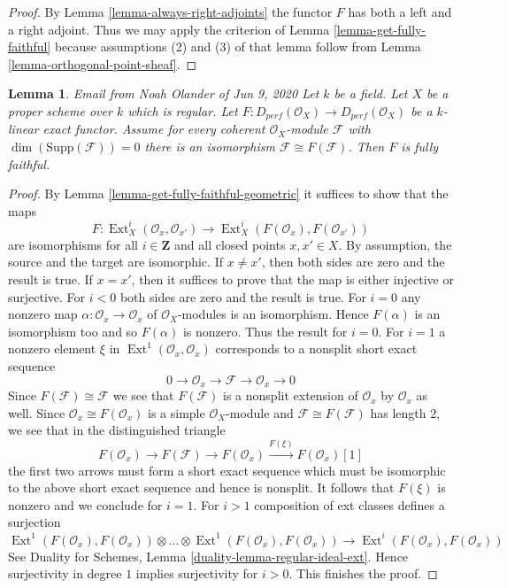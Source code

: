 \documentclass{stacks-project}
\newenvironment{reference}{\comment}{\endcomment}
\theoremstyle{plain}
\newtheorem{lemma}[subsection]{Lemma}
\theoremstyle{definition}
\theoremstyle{remark}
\numberwithin{equation}{subsection}
\def\Ext{\mathop{\mathrm{Ext}}\nolimits}
\begin{document}
\begin{proof}
By Lemma \ref{lemma-always-right-adjoints} the functor $F$
has both a left and a right adjoint. Thus we may apply the criterion
of Lemma \ref{lemma-get-fully-faithful}
because assumptions (2) and (3) of that lemma
follow from Lemma \ref{lemma-orthogonal-point-sheaf}.
\end{proof}

\begin{lemma}
\label{lemma-noah-pre}
\begin{reference}
Email from Noah Olander of Jun 9, 2020
\end{reference}
Let $k$ be a field. Let $X$ be a proper scheme over $k$ which is regular.
Let $F : D_{perf}(\mathcal{O}_X) \to D_{perf}(\mathcal{O}_X)$
be a $k$-linear exact functor. Assume for every coherent
$\mathcal{O}_X$-module $\mathcal{F}$ with $\dim(\text{Supp}(\mathcal{F})) = 0$
there is an isomorphism $\mathcal{F} \cong F(\mathcal{F})$.
Then $F$ is fully faithful.
\end{lemma}

\begin{proof}
By Lemma \ref{lemma-get-fully-faithful-geometric} it suffices to show
that the maps
$$
F : \Ext^i_X(\mathcal{O}_x, \mathcal{O}_{x'})
\longrightarrow
\Ext^i_X(F(\mathcal{O}_x), F(\mathcal{O}_{x'}))
$$
are isomorphisms for all $i \in \mathbf{Z}$ and all closed points
$x, x' \in X$. By assumption, the source and the target are isomorphic.
If $x \not = x'$, then both sides are zero and the result is true.
If $x = x'$, then it suffices to prove that the map is either injective
or surjective. For $i < 0$ both sides are zero and the result is true.
For $i = 0$ any nonzero map $\alpha : \mathcal{O}_x \to \mathcal{O}_x$ of
$\mathcal{O}_X$-modules is an isomorphism. Hence $F(\alpha)$ is an
isomorphism too and so $F(\alpha)$ is nonzero. Thus the result for $i = 0$.
For $i = 1$ a nonzero element $\xi$ in $\Ext^1(\mathcal{O}_x, \mathcal{O}_x)$
corresponds to a nonsplit short exact sequence
$$
0 \to \mathcal{O}_x \to \mathcal{F} \to \mathcal{O}_x \to 0
$$
Since $F(\mathcal{F}) \cong \mathcal{F}$ we see that $F(\mathcal{F})$
is a nonsplit extension of $\mathcal{O}_x$ by $\mathcal{O}_x$ as well.
Since $\mathcal{O}_x \cong F(\mathcal{O}_x)$ is a simple
$\mathcal{O}_X$-module and $\mathcal{F} \cong F(\mathcal{F})$ has
length $2$, we see that in the distinguished triangle
$$
F(\mathcal{O}_x) \to F(\mathcal{F}) \to F(\mathcal{O}_x)
\xrightarrow{F(\xi)} F(\mathcal{O}_x)[1]
$$
the first two arrows must form a short exact sequence which must be
isomorphic to the above short exact sequence and hence is nonsplit.
It follows that $F(\xi)$ is nonzero and we conclude for $i = 1$.
For $i > 1$ composition of ext classes defines a surjection
$$
\Ext^1(F(\mathcal{O}_x), F(\mathcal{O}_x)) \otimes \ldots \otimes
\Ext^1(F(\mathcal{O}_x), F(\mathcal{O}_x))
\longrightarrow
\Ext^i(F(\mathcal{O}_x), F(\mathcal{O}_x))
$$
See Duality for Schemes, Lemma \ref{duality-lemma-regular-ideal-ext}.
Hence surjectivity in degree $1$ implies surjectivity for $i > 0$.
This finishes the proof.
\end{proof}
\end{document}
